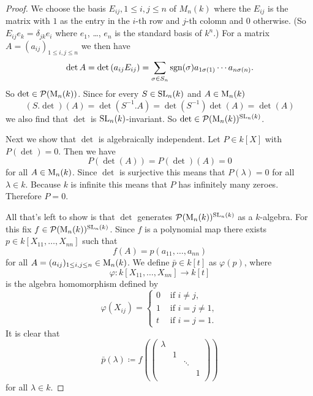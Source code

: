 \begin{proof}
  We choose the basis $E_{ij}, 1 \leq i,j \leq n$ of $M_n(k)$ where the $E_{ij}$ is the matrix with $1$ as the entry in the $i$-th row and $j$-th colomn and $0$ otherwise. (So $E_{ij} e_k = \delta_{jk}e_i$ where $e_1$, \dots, $e_n$ is the standard basis of $k^n$.)  For a matrix $A = (a_{ij})_{1 \leq i,j \leq n}$ we then have
  \[
    \det A
    = \det\left( a_{ij} E_{ij}\right)
    = \sum_{\sigma \in S_n} \operatorname{sgn}(\sigma) a_{1 \sigma(1)} \dotsm a_{n \sigma(n)}.
  \]
  So $\det \in \mathcal{P}(\operatorname{M}_n(k))$. Since for every $S \in \operatorname{SL}_n(k)$ and $A \in \operatorname{M}_n(k)$
  \[
    (S.\det)(A) = \det\left(S^{-1}.A\right) = \det\left(S^{-1}\right) \det(A) = \det(A)
  \]
  we also find that $\det$ is $\operatorname{SL}_n(k)$-invariant. So $\det \in \mathcal{P}(\operatorname{M}_n(k))^{\operatorname{SL}_n(k)}$.
  
  Next we show that $\det$ is algebraically independent. Let $P \in k[X]$ with $P(\det) = 0$. Then we have
  \[
    P(\det(A)) = P(\det)(A) = 0
  \]
  for all $A \in \operatorname{M}_n(k)$. Since $\det$ is surjective this means that $P(\lambda) = 0$ for all $\lambda \in k$. Because $k$ is infinite this means that $P$ has infinitely many zeroes. Therefore $P = 0$.
  
  All that’s left to show is that $\det$ generates $\mathcal{P}(\operatorname{M}_n(k))^{\operatorname{SL}_n(k)}$ as a $k$-algebra. For this fix $f \in \mathcal{P}(\operatorname{M}_n(k))^{\operatorname{SL}_n(k)}$. Since $f$ is a polynomial map there exists $p \in k[X_{11}, \dotsc, X_{nn}]$ such that
  \[
    f(A) = p(a_{11}, \dotsc, a_{nn})
  \]
  for all $A = (a_{ij})_{1 \leq i,j \leq n} \in \operatorname{M}_n(k)$. We define $\bar{p} \in k[t]$ as $\varphi(p)$, where
  \[
    \varphi \colon k[X_{11}, \dotsc, X_{nn}] \to k[t]
  \] 
  is the algebra homomorphism defined by 
  \[
    \varphi(X_{ij}) =
    \begin{cases}
      0 & \text{ if } i \neq j, \\
      1 & \text{ if } i = j \neq 1, \\
      t & \text{ if } i = j = 1.
    \end{cases}
  \]
  It is clear that
  \[
    \bar{p}(\lambda) \coloneqq
    f\left(
      \begin{pmatrix}
        \lambda &   &        &   \\
                        & 1 &        &   \\
                        &   & \ddots &   \\
                        &   &        & 1 \\
      \end{pmatrix}
    \right)
  \]
  for all $\lambda \in k$.
  

\end{proof}
